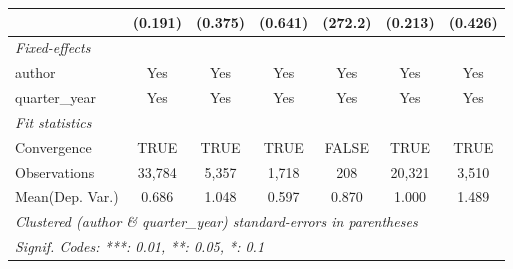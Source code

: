 \begin{tabular}{lcccccc}
                                         & (0.191)        & (0.375)       & (0.641)       & (272.2)    & (0.213)       & (0.426)\\   
   \midrule
   \emph{Fixed-effects}\\
   author                                & Yes            & Yes           & Yes           & Yes        & Yes           & Yes\\  
   quarter\_year                         & Yes            & Yes           & Yes           & Yes        & Yes           & Yes\\  
   \midrule
   \emph{Fit statistics}\\
   Convergence                           &TRUE            & TRUE          & TRUE          & FALSE      & TRUE          & TRUE\\  
   Observations                          & 33,784         & 5,357         & 1,718         & 208        & 20,321        & 3,510\\  
Mean(Dep. Var.) & 0.686 & 1.048 & 0.597 & 0.870 & 1.000 & 1.489 \\
   \midrule \midrule
   \multicolumn{7}{l}{\emph{Clustered (author \& quarter\_year) standard-errors in parentheses}}\\
   \multicolumn{7}{l}{\emph{Signif. Codes: ***: 0.01, **: 0.05, *: 0.1}}\\
\end{tabular}
\par\endgroup

